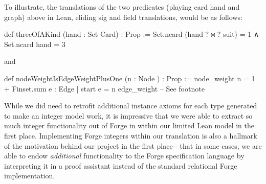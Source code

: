 To illustrate, the translations of the two predicates (playing card hand and graph) above in Lean, eliding sig and field translations, would be as follows:
\begin{lean*}
def threeOfAKind (hand : Set Card) : Prop :=
  Set.ncard (hand ?$\bowtie$? suit) = 1 ∧ Set.ncard hand = 3
\end{lean*}
and 

\begin{lean*}
def nodeWeightIsEdgeWeightPlusOne (n : Node ) : Prop :=
  node_weight n = 1 + Finset.sum { e : Edge | start e = n } edge_weight -- See footnote \footnotemark
\end{lean*}

While we did need to retrofit additional instance axioms for each type generated to make an integer model work, it is impressive that we were able to extract so much integer functionality out of Forge in within our limited Lean model in the first place. Implementing Forge integers within our translation is also a hallmark of the motivation behind our project in the first place---that in some cases, we are able to endow \emph{additional} functionality to the Forge specification language by interpreting it in a proof assistant instead of the standard relational Forge implementation. 